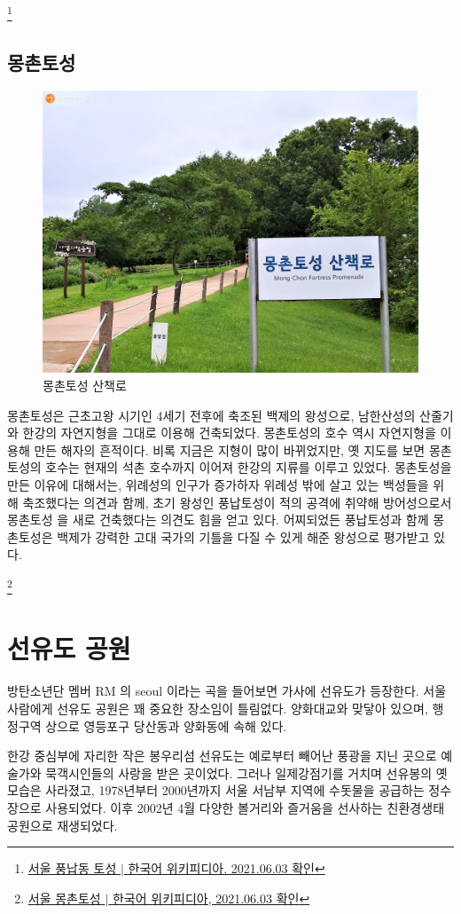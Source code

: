 \footnote{\href{https://ko.wikipedia.org/wiki/서울_풍납동_토성}{서울 풍납동 토성 $|$ 한국어 위키피디아. 2021.06.03 확인}}


\subsection{몽촌토성}

\begin{figure}
    \centering
    \includegraphics[width=.6\textwidth]{e_img/ww_-005.jpg}
    \caption{몽촌토성 산책로}
    \label{fig:haryu6}
\end{figure}


몽촌토성은 근초고왕 시기인 4세기 전후에 축조된 백제의 왕성으로, 남한산성의 
산줄기와 한강의 자연지형을 그대로 이용해 건축되었다. 몽촌토성의 호수 역시 자연지형을
이용해 만든 해자의 흔적이다. 비록 지금은 지형이 많이 바뀌었지만, 옛 지도를 보면 
몽촌토성의 호수는 현재의 석촌 호수까지 이어져 한강의 지류를 이루고 있었다. 몽촌토성을 
만든 이유에 대해서는, 위례성의 인구가 증가하자 위례성 밖에 살고 있는 백성들을 위해 
축조했다는 의견과 함께, 초기 왕성인 풍납토성이 적의 공격에 취약해 방어성으로서 몽촌토성
을 새로 건축했다는 의견도 힘을 얻고 있다. 어찌되었든 풍납토성과 함께 몽촌토성은 
백제가 강력한 고대 국가의 기틀을 다질 수 있게 해준 왕성으로 평가받고 있다.

\footnote {\href{https://ko.wikipedia.org/wiki/서울_몽촌토성}{서울 몽촌토성 $|$ 한국어 위키피디아, 2021.06.03 확인}}

\section{선유도 공원}
방탄소년단 멤버 RM 의 seoul 이라는 곡을 들어보면 가사에 선유도가 등장한다. 서울
사람에게 선유도 공원은 꽤 중요한 장소임이 틀림없다. 양화대교와 맞닿아 있으며, 
행정구역 상으로 영등포구 당산동과 양화동에 속해 있다.

한강 중심부에 자리한 작은 봉우리섬 선유도는 예로부터 빼어난 풍광을 지닌 곳으로
예술가와 묵객시인들의 사랑을 받은 곳이었다. 그러나 일제강점기를 거치며 선유봉의 옛
모습은 사라졌고, 1978년부터 2000년까지 서울 서남부 지역에 수돗물을 공급하는 
정수장으로 사용되었다. 이후 2002년 4월 다양한 볼거리와 즐거움을 선사하는 
친환경생태공원으로 재생되었다.


